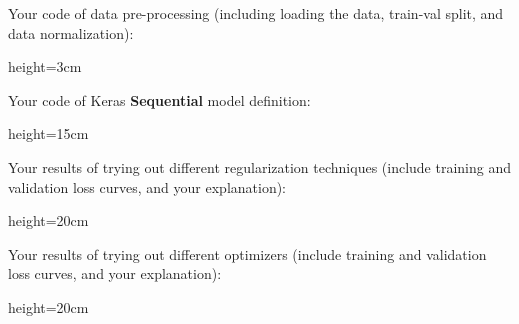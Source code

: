 \clearpage
\begin{questions}
    \question[2] Your code of data pre-processing (including loading the data, train-val split, and data normalization):
    
    \begin{soln}{height=3cm}
    \end{soln}
    
    \question[5] Your code of Keras \textbf{Sequential} model definition:
    
    \begin{soln}{height=15cm}
    \end{soln}
    
    \clearpage
    \question[9] Your results of trying out different regularization techniques (include training and validation loss curves, and your explanation):
    
    \begin{soln}{height=20cm}
    \end{soln}
    
    \clearpage
    \question[9] Your results of trying out different optimizers (include training and validation loss curves, and your explanation):
    
    \begin{soln}{height=20cm}
    \end{soln}
\end{questions}


\clearpage
